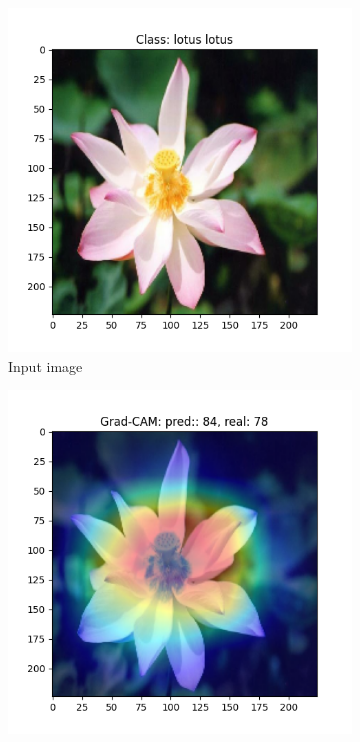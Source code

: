 \begin{figure}[h!]
    \centering
    \begin{subfigure}[b]{0.24\textwidth}
        \centering
        \includegraphics[width=\textwidth]{Images/saliency-flowers/172/image_172.png}
        \caption{Input image}
    \end{subfigure}
    \hfill
    \begin{subfigure}[b]{0.24\textwidth}
        \centering
        \includegraphics[width=\textwidth]{Images/saliency-flowers/172/GradCAM_no_aug.png}

\end{subfigure}
\end{figure}

